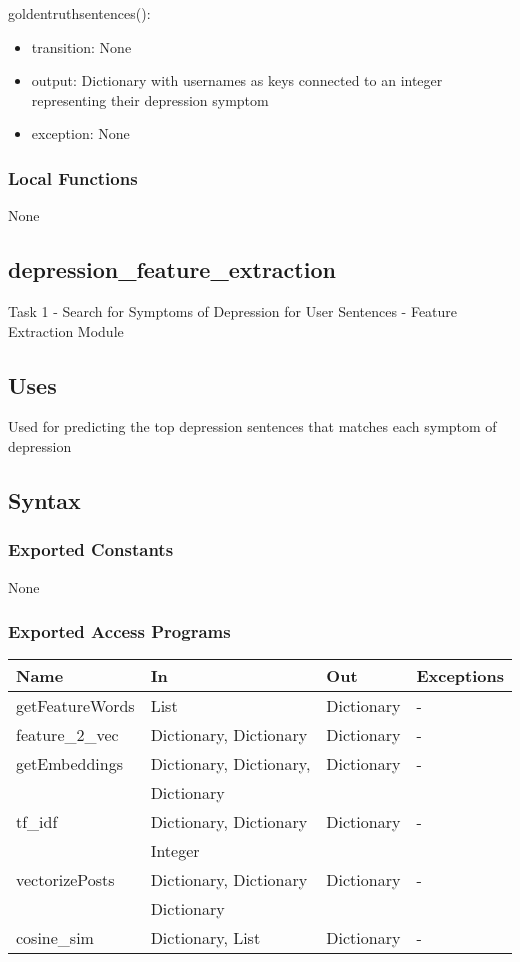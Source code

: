 \documentclass[12pt, titlepage]{article}
\begin{document}
\noindent goldentruthsentences():
\begin{itemize}
\item transition: None
\item output: Dictionary with usernames as keys connected to an integer representing their depression symptom 
\item exception: None
\end{itemize}

\subsubsection{Local Functions}

None

\subsection{depression\_feature\_extraction}

Task 1 - Search for Symptoms of Depression for User Sentences - Feature Extraction Module

\subsection{Uses}

Used for predicting the top depression sentences that matches each symptom of depression

\subsection{Syntax}

\subsubsection{Exported Constants}

None

\subsubsection{Exported Access Programs}

\begin{center}
\begin{tabular}{p{3.5cm} p{4.5cm} p{3cm} p{2cm}}
\hline
\textbf{Name} & \textbf{In} & \textbf{Out} & \textbf{Exceptions} \\
\hline
getFeatureWords & List & Dictionary & - \\
feature\_2\_vec & Dictionary, Dictionary & Dictionary & - \\
getEmbeddings & Dictionary, Dictionary,  & Dictionary & - \\
 & Dictionary &  &  \\
tf\_idf & Dictionary, Dictionary & Dictionary & - \\
 & Integer &  &  \\
vectorizePosts & Dictionary, Dictionary & Dictionary & - \\
 & Dictionary &  &  \\
cosine\_sim & Dictionary, List & Dictionary & - \\
\hline
\end{tabular}
\end{center}
\end{document}
